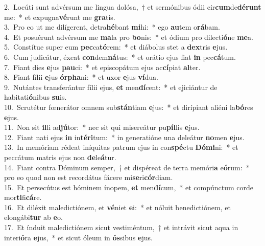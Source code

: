 {2.~}Locúti sunt advérsum me lingua dolósa,~† et sermónibus ódii cir\textbf{cum}de\textbf{dé}\textbf{runt} me:~* et expugna\textbf{vé}runt me \textbf{gra}tis.\\
{3.~}Pro eo ut me dilígerent, detra\textbf{hé}bant \textbf{mi}hi:~* ego \textbf{au}tem o\textbf{rá}bam.\\
{4.~}Et posuérunt advérsum me \textbf{ma}la pro \textbf{bo}nis:~* et ódium pro dilecti\textbf{ó}ne \textbf{me}a.\\
{5.~}Constítue super eum \textbf{pec}ca\textbf{tó}rem:~* et diábolus stet a \textbf{dex}tris \textbf{e}jus.\\
{6.~}Cum judicátur, éxeat \textbf{con}dem\textbf{ná}tus:~* et orátio ejus fiat \textbf{in} pec\textbf{cá}tum.\\
{7.~}Fiant dies \textbf{e}jus \textbf{pau}ci:~* et episcopátum ejus ac\textbf{cí}piat \textbf{al}ter.\\
{8.~}Fiant fílii \textbf{e}jus \textbf{ór}\textbf{pha}ni:~* et uxor \textbf{e}jus \textbf{ví}dua.\\
{9.~}Nutántes transferántur fílii ejus, \textbf{et} men\textbf{dí}cent:~* et ejiciántur de habitati\textbf{ó}nibus \textbf{su}is.\\
{10.~}Scrutétur fœnerátor omnem sub\textbf{stán}tiam \textbf{e}jus:~* et dirípiant aliéni la\textbf{bó}res \textbf{e}jus.\\
{11.~}Non sit \textbf{il}li ad\textbf{jú}tor:~* nec sit qui misereátur pu\textbf{píl}lis \textbf{e}jus.\\
{12.~}Fiant nati ejus \textbf{in} in\textbf{té}\textbf{ri}tum:~* in generatióne una deleátur \textbf{no}men \textbf{e}jus.\\
{13.~}In memóriam rédeat iníquitas patrum ejus in con\textbf{spé}ctu \textbf{Dó}\textbf{mi}ni:~* et peccátum matris ejus non \textbf{de}le\textbf{á}tur.\\
{14.~}Fiant contra Dóminum semper,~† et dispéreat de terra memóri\textbf{a} e\textbf{ó}rum:~* pro eo quod non est recordátus fácere mi\textbf{se}ri\textbf{cór}diam.\\
{15.~}Et persecútus est hóminem ínopem, \textbf{et} men\textbf{dí}cum,~* et compúnctum corde mor\textbf{ti}fi\textbf{cá}re.\\
{16.~}Et diléxit maledictiónem, et \textbf{vé}niet \textbf{e}i:~* et nóluit benedictiónem, et elongábi\textbf{tur} ab \textbf{e}o.\\
{17.~}Et índuit maledictiónem sicut vestiméntum,~† et intrávit sicut aqua in interi\textbf{ó}ra \textbf{e}jus,~* et sicut óleum in \textbf{ós}sibus \textbf{e}jus.\\
